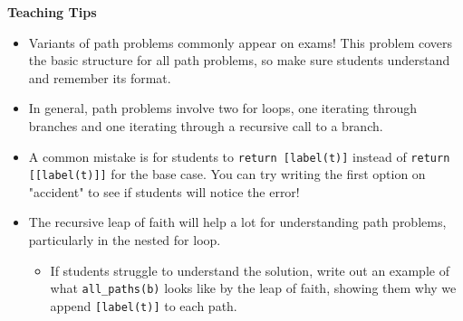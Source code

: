 \begin{blocksection}
\begin{guide}
  \textbf{Teaching Tips}
  \begin{itemize}
      \item Variants of path problems commonly appear on exams! This problem covers the basic structure for all path problems, so make sure students understand and remember its format.
      \item In general, path problems involve two for loops, one iterating through branches and one iterating through a recursive call to a branch.
      \item A common mistake is for students to \lstinline$return [label(t)]$ instead of \lstinline$return [[label(t)]]$ for the base case. You can try writing the first option on "accident" to see if students will notice the error!
      \item The recursive leap of faith will help a lot for understanding path problems, particularly in the nested for loop.
      \begin{itemize}
        \item If students struggle to understand the solution, write out an example of what \lstinline$all_paths(b)$ looks like by the leap of faith, showing them why we append \lstinline$[label(t)]$ to each path.
      \end{itemize}
  \end{itemize}
\end{guide}
\end{blocksection}